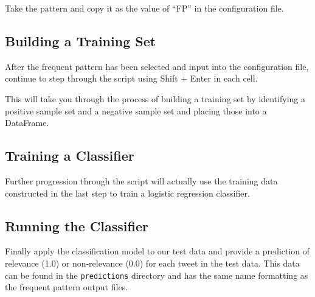 Take the pattern and copy it as the value of ``FP'' in the configuration file.

\subsection{Building a Training Set}

After the frequent pattern has been selected and input into the configuration file, continue to step through the script using Shift + Enter  in each cell.

This will take you through the process of building a training set by identifying a positive sample set and a negative sample set and placing those into a DataFrame.

\subsection{Training a Classifier}

Further progression through the script will actually use the training data constructed in the last step to train a logistic regression classifier.

\subsection{Running the Classifier}

Finally apply the classification model to our test data and provide a prediction of relevance (1.0) or non-relevance (0.0) for each tweet in the test data. This data can be found in the \texttt{predictions} directory and has the same name formatting as the frequent pattern output files.






